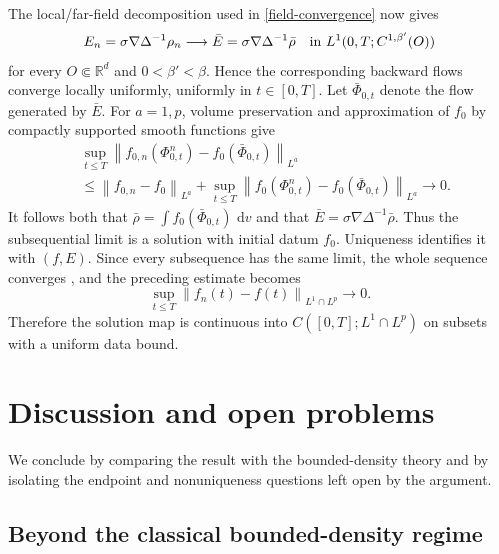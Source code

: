 \documentclass[11pt]{article}
\newcommand{\R}{\mathbb R}
\newcommand{\norm}[1]{\left\lVert #1\right\rVert}
\newcommand{\dd}{\,\mathrm d}
\begin{document}
The local/far-field decomposition used in
\eqref{field-convergence} now gives
\begin{equation*}
 E_n=\sigma\nabla\Delta^{-1}\rho_n
 \longrightarrow
 \bar E=\sigma\nabla\Delta^{-1}\bar\rho
 \quad\hbox{in }L^1(0,T;C^{1,\beta'}(O))
\end{equation*}
for every $O\Subset\R^d$ and $0<\beta'<\beta$.  Hence the corresponding
backward flows converge locally uniformly, uniformly in $t\in[0,T]$.
Let $\bar\Phi_{0,t}$ denote the flow generated by $\bar E$.  For $a=1,p$,
volume preservation and approximation of $f_0$ by compactly supported smooth
functions give
\begin{align*}
 &\sup_{t\leq T}
 \norm{f_{0,n}(\Phi^n_{0,t})-f_0(\bar\Phi_{0,t})}_{L^a}\\
 &\leq \norm{f_{0,n}-f_0}_{L^a}
   +\sup_{t\leq T}\norm{
      f_0(\Phi^n_{0,t})-f_0(\bar\Phi_{0,t})}_{L^a}
      \longrightarrow0.
\end{align*}
It follows both that
$\bar\rho=\int f_0(\bar\Phi_{0,t})\,\dd v$ and that
$\bar E=\sigma\nabla\Delta^{-1}\bar\rho$.  Thus the subsequential limit is  a
solution with  initial  datum $f_0$.  Uniqueness identifies  it with $(f,E)$.
Since every subsequence has the same limit,  the whole sequence converges , and
the preceding estimate becomes
\begin{equation*}
 \sup_{t\leq T}\norm{f_n(t)-f(t)}_{L^1\cap L^p}\longrightarrow0.
\end{equation*} 
 Therefore  the solution map is continuous into
$C([0,T];L^1\cap L^p)$ on subsets with a uniform data bound.

\section{Discussion and open problems}\label{sec:endpoints}

We conclude by comparing the result with the bounded-density theory and by
isolating the endpoint and nonuniqueness questions left open by the argument.

\subsection{Beyond the classical bounded-density regime}
\end{document}
